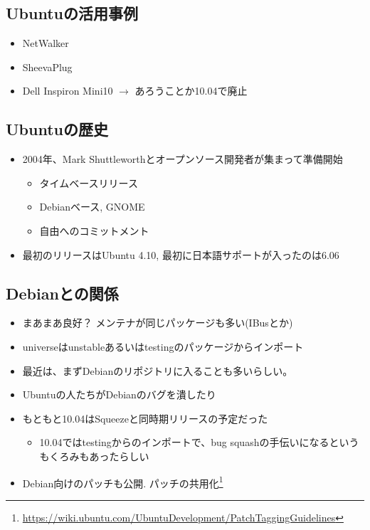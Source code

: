\documentclass[mingoth,a4paper]{jsarticle}
\begin{document}
\subsection{Ubuntuの活用事例}
\begin{itemize}
      \item NetWalker
      \item SheevaPlug
      \item Dell Inspiron Mini10 $\rightarrow$  あろうことか10.04で廃止
\end{itemize}

\subsection{Ubuntuの歴史}

\begin{itemize}
      \item 2004年、Mark Shuttleworthとオープンソース開発者が集まって準備開始
    \begin{itemize}
          \item タイムベースリリース
          \item Debianベース, GNOME
          \item 自由へのコミットメント
    \end{itemize}
      \item 最初のリリースはUbuntu 4.10, 最初に日本語サポートが入ったのは6.06
\end{itemize}

\subsection{Debianとの関係}
\begin{itemize}
      \item まあまあ良好？ メンテナが同じパッケージも多い(IBusとか)
      \item universeはunstableあるいはtestingのパッケージからインポート
      \item 最近は、まずDebianのリポジトリに入ることも多いらしい。
      \item Ubuntuの人たちがDebianのバグを潰したり
      \item もともと10.04はSqueezeと同時期リリースの予定だった
    \begin{itemize}
          \item 10.04ではtestingからのインポートで、bug squashの手伝いになるというもくろみもあったらしい
    \end{itemize}
    \item Debian向けのパッチも公開. 
  パッチの共用化\footnote{\url{https://wiki.ubuntu.com/UbuntuDevelopment/PatchTaggingGuidelines}}
\end{itemize}
\end{document}
